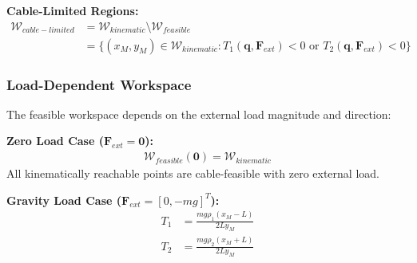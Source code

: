 \textbf{Cable-Limited Regions:}
\begin{align}
\mathcal{W}_{cable-limited} &= \mathcal{W}_{kinematic} \setminus \mathcal{W}_{feasible} \\
&= \{(x_M, y_M) \in \mathcal{W}_{kinematic} : T_1(\bm{q}, \bm{F}_{ext}) < 0 \text{ or } T_2(\bm{q}, \bm{F}_{ext}) < 0\}
\end{align}

\subsubsection{Load-Dependent Workspace}
The feasible workspace depends on the external load magnitude and direction:

\textbf{Zero Load Case ($\bm{F}_{ext} = \bm{0}$):}
\begin{align}
\mathcal{W}_{feasible}(\bm{0}) = \mathcal{W}_{kinematic}
\end{align}
All kinematically reachable points are cable-feasible with zero external load.

\textbf{Gravity Load Case ($\bm{F}_{ext} = [0, -mg]^T$):}
\begin{align}
T_1 &= \frac{mg \rho_1 (x_M - L)}{2L y_M} \\
T_2 &= \frac{mg \rho_2 (x_M + L)}{2L y_M}
\end{align}

